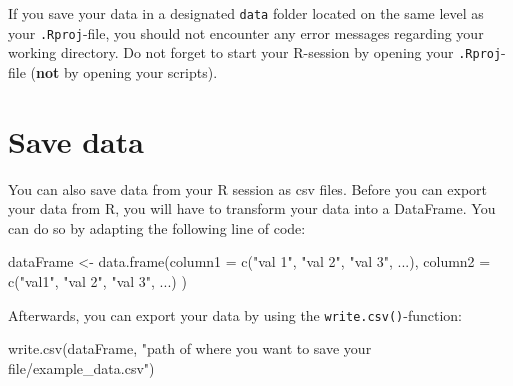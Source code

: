 \documentclass[
  letterpaper,
  DIV=11,
  numbers=noendperiod,
  oneside]{scrreprt}
\newenvironment{Shaded}{\begin{snugshade}}{\end{snugshade}}
\newcommand{\AttributeTok}[1]{\textcolor[rgb]{0.40,0.45,0.13}{#1}}
\newcommand{\FunctionTok}[1]{\textcolor[rgb]{0.28,0.35,0.67}{#1}}
\newcommand{\NormalTok}[1]{\textcolor[rgb]{0.00,0.23,0.31}{#1}}
\newcommand{\OtherTok}[1]{\textcolor[rgb]{0.00,0.23,0.31}{#1}}
\newcommand{\StringTok}[1]{\textcolor[rgb]{0.13,0.47,0.30}{#1}}
\begin{document}
\begin{tcolorbox}[enhanced jigsaw, arc=.35mm, left=2mm, breakable, toprule=.15mm, opacityback=0, colframe=quarto-callout-important-color-frame, colback=white, rightrule=.15mm, bottomrule=.15mm, leftrule=.75mm]
\begin{minipage}[t]{5.5mm}
\textcolor{quarto-callout-important-color}{\faExclamation}
\end{minipage}%
\begin{minipage}[t]{\textwidth - 5.5mm}

If you save your data in a designated \texttt{data} folder located on
the same level as your \texttt{.Rproj}-file, you should not encounter
any error messages regarding your working directory. Do not forget to
start your R-session by opening your \texttt{.Rproj}-file (\textbf{not}
by opening your scripts).

\end{minipage}%
\end{tcolorbox}

\hypertarget{save-data}{%
\section{Save data}\label{save-data}}

You can also save data from your R session as csv files. Before you can
export your data from R, you will have to transform your data into a
DataFrame. You can do so by adapting the following line of code:

\begin{Shaded}
\begin{Highlighting}[]
\NormalTok{    dataFrame }\OtherTok{\textless{}{-}} \FunctionTok{data.frame}\NormalTok{(}\AttributeTok{column1 =} \FunctionTok{c}\NormalTok{(}\StringTok{"val 1"}\NormalTok{, }\StringTok{"val 2"}\NormalTok{, }\StringTok{"val 3"}\NormalTok{, ...),}
                            \AttributeTok{column2 =} \FunctionTok{c}\NormalTok{(}\StringTok{"val1"}\NormalTok{, }\StringTok{"val 2"}\NormalTok{, }\StringTok{"val 3"}\NormalTok{, ...)}
\NormalTok{                            )}
\end{Highlighting}
\end{Shaded}

Afterwards, you can export your data by using the
\texttt{write.csv()}-function:

\begin{Shaded}
\begin{Highlighting}[]
    \FunctionTok{write.csv}\NormalTok{(dataFrame, }\StringTok{"path of where you want to save your file/example\_data.csv"}\NormalTok{)}
\end{Highlighting}
\end{Shaded}
\end{document}
